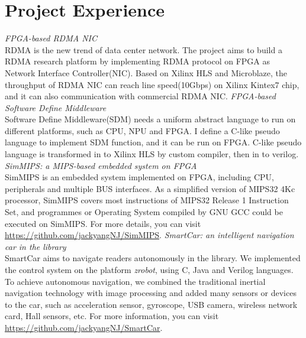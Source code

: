 \documentclass[11pt,a4paper]{moderncv}
\begin{document}
\section{Project Experience}
{
	\smallskip
	\emph{FPGA-based RDMA NIC}
	\medskip \\
	RDMA is the new trend of data center network. The project aims to build a RDMA research platform by implementing RDMA protocol on FPGA as Network Interface Controller(NIC). Based on Xilinx HLS and Microblaze, the throughput of RDMA NIC can reach line speed(10Gbps) on Xilinx Kintex7 chip, and it can also communication with commercial RDMA NIC.\newline
}
{
   \smallskip
	\emph{FPGA-based Software Define Middleware}
	\medskip \\
	Software Define Middleware(SDM) needs a uniform abstract language to run on different platforms, such as CPU, NPU and FPGA. I define a C-like pseudo language to implement SDM function, and it can be run on FPGA. C-like pseudo language is transformed in to Xilinx HLS by custom compiler, then in to verilog. 
}
{
    \smallskip
    \emph{SimMIPS: a MIPS-based embedded system on FPGA}
    \medskip \\
    SimMIPS is an embedded system implemented on FPGA, including CPU, peripherals and multiple BUS interfaces. As a simplified version of MIPS32 4Kc processor, SimMIPS covers most instructions of MIPS32 Release 1 Instruction Set, and programmes or Operating System compiled by GNU GCC could be executed on SimMIPS. For more details, you can visit \url{https://github.com/jackyangNJ/SimMIPS}.\newline
}
{
    \smallskip
    \emph{SmartCar: an intelligent navigation car in the library}
    \medskip  \\
    SmartCar aims to navigate readers autonomously in the library.
    We implemented the control system on the platform {\emph{zrobot}}, using C, Java and Verilog languages. To achieve autonomous navigation, we combined the traditional inertial navigation technology with image processing and added many sensors or devices to the car, such as acceleration sensor, gyroscope, USB camera, wireless network card, Hall sensors, etc. For more information, you can visit \url{https://github.com/jackyangNJ/SmartCar}.\newline
}
\end{document}
